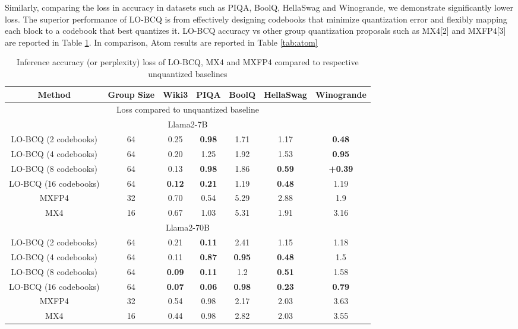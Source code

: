 Similarly, comparing the loss in accuracy in datasets such as PIQA, BoolQ, HellaSwag and Winogrande, we demonstrate significantly lower loss. The superior performance of LO-BCQ is from effectively designing codebooks that minimize quantization error and flexibly mapping each block to a codebook that best quantizes it. LO-BCQ accuracy vs other group quantization proposals such as MX4[2] and MXFP4[3] are reported in Table 
 \ref{tab:large_gs}. In comparison, Atom results are reported in Table \ref{tab:atom}


\begin{table}[h]
\centering
\begin{tabular}{|c|c|c|c|c|c|c|} 
\hline
 Method &  Group Size & Wiki3  & PIQA & BoolQ & HellaSwag & Winogrande \\
 \hline                                
 \hline
  \multicolumn{7}{c}{Loss compared to unquantized baseline} \\ 
 \hline
 \hline
   \multicolumn{7}{c}{Llama2-7B} \\
\hline
LO-BCQ (2 codebooks) & 64 & 0.25 & \textbf{0.98} & 1.71 & 1.17 & \textbf{0.48} \\
\hline
LO-BCQ (4 codebooks) & 64 & 0.20 & 1.25 & 1.92 & 1.53 & \textbf{0.95} \\
\hline
LO-BCQ (8 codebooks) & 64 & 0.13 & \textbf{0.98} & 1.86 & \textbf{0.59} & \textbf{+0.39} \\
\hline
LO-BCQ (16 codebooks) & 64 & \textbf{0.12} & \textbf{0.21} & 1.19 & \textbf{0.48} & 1.19 \\
\hline
MXFP4 & 32 & 0.70 & 0.54 & 5.29 & 2.88 & 1.9 \\
\hline
MX4 & 16 & 0.67 & 1.03 & 5.31 & 1.91 & 3.16 \\
\hline
\hline
   \multicolumn{7}{c}{Llama2-70B} \\
\hline
\hline
LO-BCQ (2 codebooks) & 64 & 0.21 & \textbf{0.11} & 2.41 & 1.15 & 1.18 \\
\hline
LO-BCQ (4 codebooks) & 64 & 0.11 & \textbf{0.87} & \textbf{0.95} & \textbf{0.48} & 1.5 \\
\hline
LO-BCQ (8 codebooks) & 64 & \textbf{0.09} & \textbf{0.11} & 1.2 & \textbf{0.51} & 1.58 \\
\hline
LO-BCQ (16 codebooks) & 64 & \textbf{0.07} & \textbf{0.06} & \textbf{0.98} & \textbf{0.23} & \textbf{0.79} \\
\hline
MXFP4 & 32 & 0.54 & 0.98 & 2.17 & 2.03 & 3.63 \\
\hline
MX4 & 16 & 0.44 & 0.98 & 2.82 & 2.03 & 3.55 \\
\hline
    \end{tabular}
    \caption{Inference accuracy (or perplexity) loss of LO-BCQ, MX4 and MXFP4 compared to respective unquantized baselines}
    \label{tab:large_gs}
\end{table}

